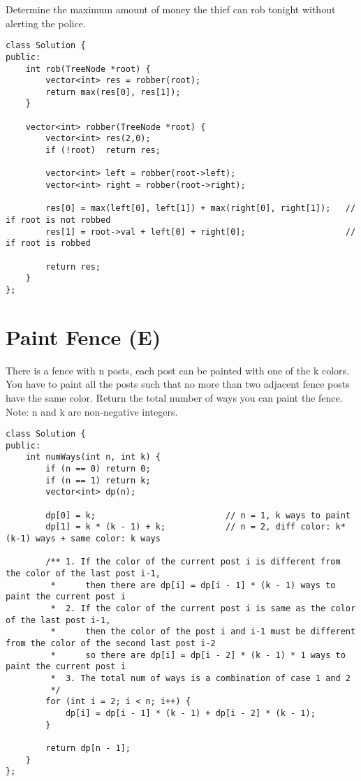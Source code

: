 Determine the maximum amount of money the thief can rob tonight without alerting the police. \\

\begin{lstlisting}
class Solution {
public:
    int rob(TreeNode *root) {
        vector<int> res = robber(root);
        return max(res[0], res[1]);
    }
    
    vector<int> robber(TreeNode *root) {
        vector<int> res(2,0);
        if (!root)  return res;
        
        vector<int> left = robber(root->left);
        vector<int> right = robber(root->right);
        
        res[0] = max(left[0], left[1]) + max(right[0], right[1]);   // if root is not robbed
        res[1] = root->val + left[0] + right[0];                    // if root is robbed
        
        return res;
    }
};
\end{lstlisting}


\section{Paint Fence (E)}
There is a fence with n posts, each post can be painted with one of the k colors. You have to paint all the posts such that no more than two adjacent fence posts have the same color. Return the total number of ways you can paint the fence.\\

Note: n and k are non-negative integers.\\

\begin{lstlisting}
class Solution {
public:
    int numWays(int n, int k) {
        if (n == 0) return 0;
        if (n == 1) return k;
        vector<int> dp(n);
        
        dp[0] = k;                          // n = 1, k ways to paint
        dp[1] = k * (k - 1) + k;            // n = 2, diff color: k*(k-1) ways + same color: k ways
        
        /** 1. If the color of the current post i is different from the color of the last post i-1,
         *      then there are dp[i] = dp[i - 1] * (k - 1) ways to paint the current post i
         *  2. If the color of the current post i is same as the color of the last post i-1,
         *      then the color of the post i and i-1 must be different from the color of the second last post i-2
         *      so there are dp[i] = dp[i - 2] * (k - 1) * 1 ways to paint the current post i  
         *  3. The total num of ways is a combination of case 1 and 2
         */
        for (int i = 2; i < n; i++) {
            dp[i] = dp[i - 1] * (k - 1) + dp[i - 2] * (k - 1);
        }
        
        return dp[n - 1];
    }
};
\end{lstlisting}


